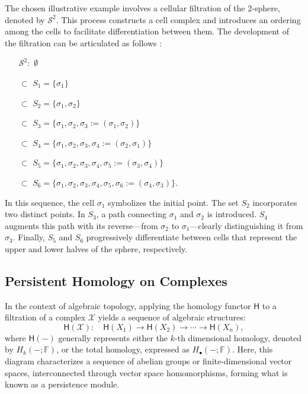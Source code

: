 \begin{example}
	\label{filteredsphere} The chosen illustrative example involves a cellular filtration
	of the 2-sphere, denoted by $\mathcal{S}^{2}$. This process constructs a cell complex
	and introduces an ordering among the cells to facilitate differentiation between
	them. The development of the filtration can be articulated as follows
	\cite[§2.2]{de2011dualities}:

	\begin{itemize}
		\item[$\mathcal{S}^{2}:$] $\emptyset$

		\item[$\subset$] $S_{1} = \{\sigma_{1}\}$

		\item[$\subset$] $S_{2} = \{\sigma_{1}, \sigma_{2}\}$

		\item[$\subset$] $S_{3} = \{\sigma_{1}, \sigma_{2}, \sigma_{3} := (\sigma_{1}
			, \sigma_{2})\}$

		\item[$\subset$] $S_{4} = \{\sigma_{1}, \sigma_{2}, \sigma_{3}, \sigma_{4} :=
			(\sigma_{2}, \sigma_{1})\}$

		\item[$\subset$] $S_{5} = \{\sigma_{1}, \sigma_{2}, \sigma_{3}, \sigma_{4}, \sigma
			_{5} := (\sigma_{3}, \sigma_{4})\}$

		\item[$\subset$] $S_{6} = \{\sigma_{1}, \sigma_{2}, \sigma_{3}, \sigma_{4}, \sigma
			_{5}, \sigma_{6} := (\sigma_{4}, \sigma_{3})\}.$
	\end{itemize}

	In this sequence, the cell $\sigma_{1}$ symbolizes the initial point. The set $S
	_{2}$ incorporates two distinct points. In $S_{3}$, a path connecting $\sigma_{1}$
	and $\sigma_{2}$ is introduced. $S_{4}$ augments this path with its
	reverse—from $\sigma_{2}$ to $\sigma_{1}$—clearly distinguishing it from $\sigma
	_{3}$. Finally, $S_{5}$ and $S_{6}$ progressively differentiate between cells that
	represent the upper and lower halves of the sphere, respectively.
\end{example}

\subsection{Persistent Homology on Complexes}
In the context of algebraic topology, applying the homology functor $\mathsf{H}$
to a filtration of a complex $\mathcal{X}$ yields a sequence of algebraic structures:
\begin{equation}
	\mathsf{H}(\mathcal{X}): \quad \mathsf{H}(X_{1}) \to \mathsf{H}(X_{2}) \to \cdots
	\to \mathsf{H}(X_{n}),
\end{equation}
where $\mathsf{H}(-)$ generally represents either the $k$-th dimensional
homology, denoted by $H_{k}(-;\mathbb{F})$, or the total homology, expressed as $H
_{\bullet}(-;\mathbb{F})$. Here, this diagram characterizes a sequence of abelian
groups or finite-dimensional vector spaces, interconnected through vector space
homomorphisms, forming what is known as a persistence module.

